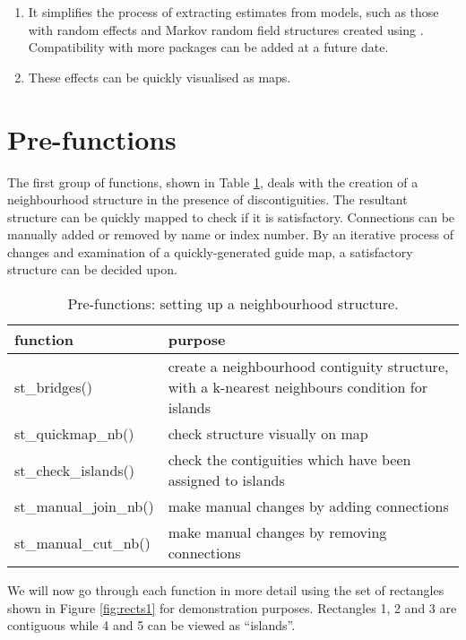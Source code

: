 \begin{enumerate}
\def\labelenumi{\arabic{enumi}.}
\item
  It simplifies the process of extracting estimates from models, such as those with random effects and Markov random field structures created using . Compatibility with more packages can be added at a future date.
\item
  These effects can be quickly visualised as  maps.
\end{enumerate}

\hypertarget{pre-functions}{%
\section{Pre-functions}\label{pre-functions}}

The first group of functions, shown in Table \ref{tab:prefunc-latex}, deals with the creation
of a neighbourhood structure in the presence of discontiguities. The
resultant structure can be quickly mapped to check if it is
satisfactory. Connections can be manually added or removed by name or
index number. By an iterative process of changes and examination of a
quickly-generated guide map, a satisfactory structure can be decided upon.

\begin{table}

\caption{\label{tab:prefunc-latex}Pre-functions: setting up a neighbourhood structure.}
\centering
\fontsize{9}{11}\selectfont
\begin{tabular}[t]{l|>{\raggedright\arraybackslash}p{7cm}}
\hline
\textbf{function} & \textbf{purpose}\\
\hline
st\_bridges() & create a neighbourhood contiguity structure, with a k-nearest neighbours condition for islands\\
\hline
st\_quickmap\_nb() & check structure visually on map\\
\hline
st\_check\_islands() & check the contiguities which have been assigned to islands\\
\hline
st\_manual\_join\_nb() & make manual changes by adding connections\\
\hline
st\_manual\_cut\_nb() & make manual changes by removing connections\\
\hline
\end{tabular}
\end{table}

We will now go through each function in more detail using the set of rectangles shown in Figure \ref{fig:rects1} for demonstration purposes. Rectangles 1, 2 and 3 are contiguous while 4 and 5 can be viewed as ``islands''.

